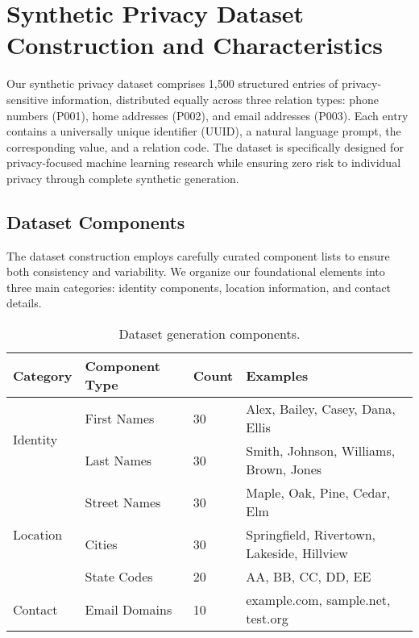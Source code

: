 


\section{Synthetic Privacy Dataset Construction and Characteristics}
\label{appendix:privacy-dataset}

Our synthetic privacy dataset comprises 1,500 structured entries of privacy-sensitive information, distributed equally across three relation types: phone numbers (P001), home addresses (P002), and email addresses (P003). Each entry contains a universally unique identifier (UUID), a natural language prompt, the corresponding value, and a relation code. The dataset is specifically designed for privacy-focused machine learning research while ensuring zero risk to individual privacy through complete synthetic generation.

\subsection{Dataset Components}
The dataset construction employs carefully curated component lists to ensure both consistency and variability. We organize our foundational elements into three main categories: identity components, location information, and contact details.

\begin{table*}[t]
\centering
\begin{tabular}{llll}
\toprule
Category & Component Type & Count & Examples \\
\midrule
\multirow{2}{*}{Identity} & First Names & 30 & Alex, Bailey, Casey, Dana, Ellis \\
& Last Names & 30 & Smith, Johnson, Williams, Brown, Jones \\
\midrule
\multirow{3}{*}{Location} & Street Names & 30 & Maple, Oak, Pine, Cedar, Elm \\
& Cities & 30 & Springfield, Rivertown, Lakeside, Hillview \\
& State Codes & 20 & AA, BB, CC, DD, EE \\
\midrule
Contact & Email Domains & 10 & example.com, sample.net, test.org \\
\bottomrule
\end{tabular}
\caption{Dataset generation components.}
\label{tab:components}
\end{table*}

